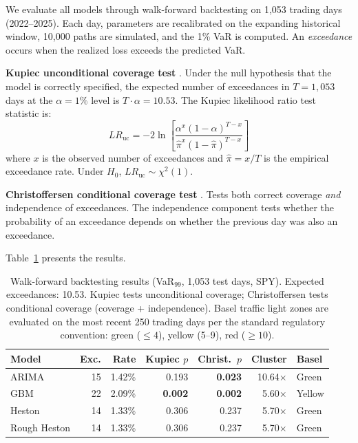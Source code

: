 \documentclass[11pt,a4paper]{article}
\begin{document}
We evaluate all models through walk-forward backtesting on 1{,}053 trading days (2022--2025).
Each day, parameters are recalibrated on the expanding historical window, 10{,}000 paths are simulated, and the 1\% VaR is computed.
An \emph{exceedance} occurs when the realized loss exceeds the predicted VaR.

\textbf{Kupiec unconditional coverage test} \citep{kupiec1995}.
Under the null hypothesis that the model is correctly specified, the expected number of exceedances in $T = 1{,}053$ days at the $\alpha = 1\%$ level is $T \cdot \alpha = 10.53$.
The Kupiec likelihood ratio test statistic is:
\begin{equation}
\label{eq:kupiec}
LR_{\text{uc}} = -2\ln\!\left[\frac{\alpha^x (1-\alpha)^{T-x}}{\hat{\pi}^x (1-\hat{\pi})^{T-x}}\right]
\end{equation}
where $x$ is the observed number of exceedances and $\hat{\pi} = x/T$ is the empirical exceedance rate.
Under $H_0$, $LR_{\text{uc}} \sim \chi^2(1)$.

\textbf{Christoffersen conditional coverage test} \citep{christoffersen1998}.
Tests both correct coverage \emph{and} independence of exceedances.
The independence component tests whether the probability of an exceedance depends on whether the previous day was also an exceedance.

Table~\ref{tab:backtest} presents the results.

\begin{table}[H]
\centering
\caption{Walk-forward backtesting results (VaR$_{99}$, 1{,}053 test days, SPY). Expected exceedances: 10.53. Kupiec tests unconditional coverage; Christoffersen tests conditional coverage (coverage + independence). Basel traffic light zones are evaluated on the most recent 250 trading days per the standard regulatory convention: green ($\leq 4$), yellow (5--9), red ($\geq 10$).}
\label{tab:backtest}
\small
\begin{tabular}{@{}lrrrrrl@{}}
\toprule
\textbf{Model} & \textbf{Exc.} & \textbf{Rate} & \textbf{Kupiec $p$} & \textbf{Christ.\ $p$} & \textbf{Cluster} & \textbf{Basel} \\
\midrule
ARIMA         & 15 & 1.42\% & 0.193          & \textbf{0.023} & 10.64$\times$ & Green  \\
GBM           & 22 & 2.09\% & \textbf{0.002} & \textbf{0.002} & 5.60$\times$  & Yellow \\
Heston        & 14 & 1.33\% & 0.306          & 0.237          & 5.70$\times$  & Green  \\
Rough Heston  & 14 & 1.33\% & 0.306          & 0.237          & 5.70$\times$  & Green  \\
\bottomrule
\end{tabular}
\end{table}
\end{document}
